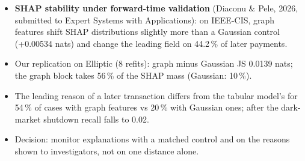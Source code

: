 \begin{itemize}\setlength{\itemsep}{2pt}
  \item \textbf{SHAP stability under forward-time validation} (Diaconu \& Pele, 2026, submitted to Expert Systems with Applications): on IEEE-CIS, graph features shift SHAP distributions slightly more than a Gaussian control (+0.00534 nats) and change the leading field on 44.2\,\% of later payments.
  \item Our replication on Elliptic (8 refits): graph minus Gaussian JS 0.0139 nats; the graph block takes 56\,\% of the SHAP mass (Gaussian: 10\,\%).
  \item The leading reason of a later transaction differs from the tabular model's for 54\,\% of cases with graph features vs 20\,\% with Gaussian ones; after the dark-market shutdown recall falls to 0.02.
  \item Decision: monitor explanations with a matched control and on the reasons shown to investigators, not on one distance alone.
\end{itemize}
